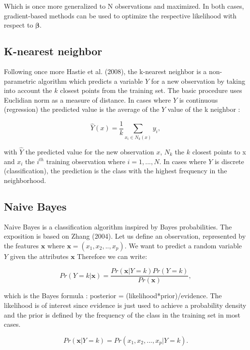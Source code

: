 \documentclass[a4paper,12pt]{article}
\numberwithin{equation}{section}
\begin{document}
Which is once more generalized to N observations and maximized. In both cases, gradient-based methods can be used to optimize the respective likelihood with respect to $\boldsymbol{\beta}$.

\subsection{K-nearest neighbor}

Following once more Hastie et al. (2008), the k-nearest neighbor is a non-parametric algorithm which predicts a variable $Y$ for a new observation by taking into account the $k$ closest points from the training set. The basic procedure uses Euclidian norm as a measure of distance. In cases where $Y$ is continuous (regression) the predicted value is the average of the $Y$ value of the k neighbor :

\begin{equation*}
\hat{Y}(x) = \frac{1}{k}\sum_{x_i \in N_k(x)}y_i,
\end{equation*} 

with $\hat{Y}$ the predicted value for the new observation $x$, $N_k$ the $k$ closest points to x and $x_i$ the $i^{th}$ training observation where $i = 1, ..., N$. In cases where $Y$ is discrete (classification), the prediction is the class with the highest frequency in the neighborhood.  

\subsection{Naive Bayes}

Naive Bayes is a classification algorithm inspired by Bayes probabilities. The exposition is based on Zhang (2004). Let us define an observation, represented by the features $\boldsymbol{x}$ where $\boldsymbol{x} = (x_1, x_2, .., x_p)$. We want to predict a random variable $Y$ given the attributes $\boldsymbol{x}$ Therefore we can write:

\begin{equation*}
Pr(Y = k|\boldsymbol{x}) =\frac{Pr(\boldsymbol{x}|Y = k)Pr(Y = k)}{Pr(\boldsymbol{x})},
\end{equation*} 

which is the Bayes formula : posterior = (likelihood*prior)/evidence. The likelihood is of interest since evidence is just used to achieve a probability density and the prior is defined by the frequency of the class in the training set in most cases. 

\begin{equation*}
Pr(\boldsymbol{x}|Y = k) = Pr(x_1, x_2,..., x_p|Y = k).
\end{equation*}
\end{document}
